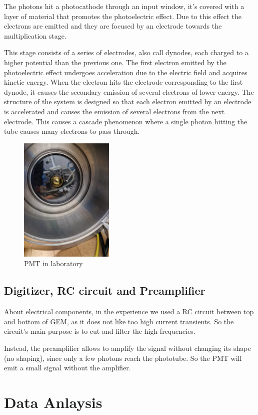 \documentclass[a4paper,twoside,openany]{book}
\begin{document}
The photons hit a photocathode through an input window, it's covered with a layer of material that promotes the photoelectric effect. Due to this effect the electrons are emitted and they are focused by an electrode towards the multiplication stage.

This stage consists of a series of electrodes, also call dynodes, each charged to a higher potential than the previous one. The first electron emitted by the photoelectric effect undergoes acceleration due to the electric field and acquires kinetic energy. When the electron hits the electrode corresponding to the first dynode, it causes the secondary emission of several electrons of lower energy. The structure of the system is designed so that each electron emitted by an electrode is accelerated and causes the emission of several electrons from the next electrode. This causes a cascade phenomenon where a single photon hitting the tube causes many electrons to pass through.

\begin{figure}[H]
\centering
\includegraphics[width=0.4\textwidth, height=0.3\textwidth]{PMT1}
\caption{PMT in laboratory}
\end{figure}

	\section{Digitizer, RC circuit and Preamplifier}
About electrical components, in the experience we used a RC circuit between top and bottom of GEM, as it does not like too high current transients. So the circuit's main purpose is to cut and filter the high frequencies.

Instead, the preamplifier allows to amplify the signal without changing its shape (no shaping), since only a few photons reach the phototube. So the PMT will emit a small signal without the amplifier.

\chapter{Data Anlaysis}
\end{document}
